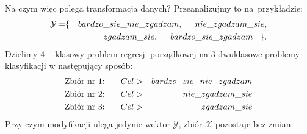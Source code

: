 \documentclass[11pt,usenames,dvipsnames,svgnames,x11names]{beamer}
\theoremstyle{plain}
\theoremstyle{definition}
\theoremstyle{remark}
\begin{document}
\begin{frame}
Na czym więc polega transformacja danych? Przeanalizujmy to na~przykładzie:
\begin{eqnarray*}
\mathcal{Y}=&\lbrace&\hspace{0mm}bardzo\_sie\_nie\_zgadzam,\hspace{5mm}nie\_zgadzam\_sie,\\ && zgadzam\_sie,\hspace{5mm}bardzo\_sie\_zgadzam\hspace{3mm} \rbrace.
\end{eqnarray*}
Dzielimy $4-$klasowy problem regresji porządkowej na $3$ dwuklasowe problemy klasyfikacji w następujący sposób:
\begin{eqnarray*}
\textrm{Zbiór nr 1: }\hspace{5mm}Cel &>& bardzo\_sie\_nie\_zgadzam\\
\textrm{Zbiór nr 2: }\hspace{5mm}Cel &>& nie\_zgadzam\_sie\\
\textrm{Zbiór nr 3: }\hspace{5mm}Cel &>& zgadzam\_sie
\end{eqnarray*}
Przy czym modyfikacji ulega jedynie wektor $\mathcal{Y}$, zbiór $\mathcal{X}$ pozostaje bez zmian.
\end{frame}
\end{document}
